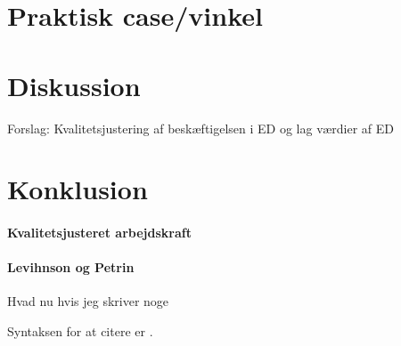 \documentclass[a4paper, 12pt, titlepage]{article}
\begin{document}
\section{Praktisk case/vinkel}
\section{Diskussion}
Forslag: Kvalitetsjustering af beskæftigelsen i ED og lag værdier af ED 
\section{Konklusion}



\paragraph{Kvalitetsjusteret arbejdskraft}



\paragraph{Levihnson og Petrin}
Hvad nu hvis jeg skriver noge

Syntaksen for at citere er \cite[pp. 211ff.]{melo2009meta}. 






\end{document}
